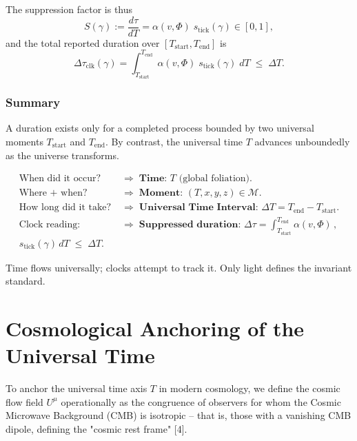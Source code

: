 \documentclass[12pt]{article}
\theoremstyle{plain} %
\newcommand{\stick}{s_{\mathrm{tick}}}
\begin{document}
\medskip
\noindent The suppression factor is thus
\begin{equation}
S(\gamma):=\frac{d\tau}{dT}=\alpha(v,\Phi)\; \stick(\gamma)\in[0,1],
\label{eq:Suppression}
\end{equation}
and the total reported duration over $[T_{\mathrm{start}},T_{\mathrm{end}}]$ is
\begin{equation}
\Delta \tau_{\mathrm{clk}}(\gamma)
= \int_{T_{\mathrm{start}}}^{T_{\mathrm{end}}}
   \alpha(v,\Phi)\;\stick(\gamma)\; dT
\;\le\; \Delta T .
\label{eq:clkDuration}
\end{equation}

\subsubsection*{Summary}
A duration exists only for a completed process bounded by two universal moments 
$T_{\text{start}}$ and $T_{\text{end}}$. 
By contrast, the universal time $T$ advances unboundedly as the universe transforms.

\begin{align*}
  \text{When did it occur?} &\;\Rightarrow\; \textbf{Time: } T \text{ (global foliation).}\\
  \text{Where + when?} &\;\Rightarrow\; \textbf{Moment: } (T,x,y,z)\in\mathcal{M}.\\
  \text{How long did it take?} &\;\Rightarrow\; \textbf{Universal Time Interval: } 
     \Delta T = T_{\text{end}}-T_{\text{start}}.\\
  \text{Clock reading: } &\;\Rightarrow\; \textbf{Suppressed duration: } 
     \Delta\tau=\int_{T_{\text{start}}}^{T_{\text{end}}}\alpha(v,\Phi)\,, \\
     \stick(\gamma)\,dT \;\le\; \Delta T.
\end{align*}


\noindent Time flows universally; clocks attempt to track it. Only light defines the invariant standard.

\section*{Cosmological Anchoring of the Universal Time}

To anchor the universal time axis $T$ in modern cosmology, we define the cosmic flow field $U^\mu$ operationally as the congruence of observers for whom the Cosmic Microwave Background (CMB) is isotropic – that is, those with a vanishing CMB dipole, defining the "cosmic rest frame" [4].
\end{document}
